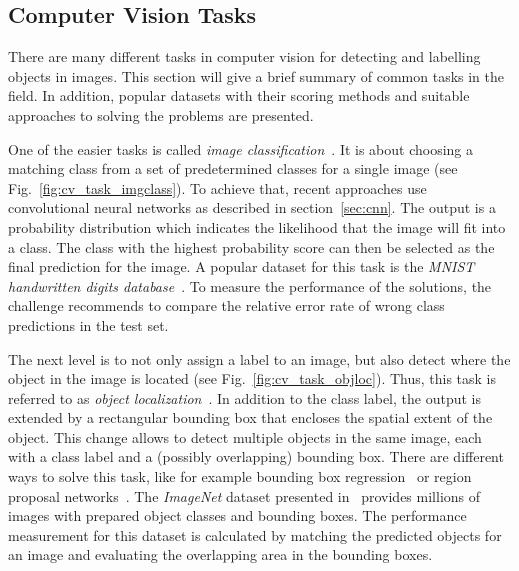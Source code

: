 \subsection{Computer Vision Tasks}
There are many different tasks in computer vision for detecting and labelling objects in images. This section will give a brief summary of common tasks in the field. In addition, popular datasets with their scoring methods and suitable approaches to solving the problems are presented.

One of the easier tasks is called \emph{image classification}~\cite[p.~98]{DLbook16}. It is about choosing a matching class from a set of predetermined classes for a single image (see Fig.~\ref{fig:cv_task_imgclass}). To achieve that, recent approaches use convolutional neural networks as described in section~\ref{sec:cnn}. The output is a probability distribution which indicates the likelihood that the image will fit into a class. The class with the highest probability score can then be selected as the final prediction for the image. A popular dataset for this task is the \emph{MNIST handwritten digits database}~\cite{mnist10}. To measure the performance of the solutions, the challenge recommends to compare the relative error rate of wrong class predictions in the test set.

The next level is to not only assign a label to an image, but also detect where the object in the image is located (see Fig.~\ref{fig:cv_task_objloc}). Thus, this task is referred to as \emph{object localization}~\cite{rcnn14}. In addition to the class label, the output is extended by a rectangular bounding box that encloses the spatial extent of the object. This change allows to detect multiple objects in the same image, each with a class label and a (possibly overlapping) bounding box. There are different ways to solve this task, like for example bounding box regression~\cite{obj_detection13} or region proposal networks~\cite{ff-rcnn17}. The \emph{ImageNet} dataset presented in~\cite{imgnet09} provides millions of images with prepared object classes and bounding boxes. The performance measurement for this dataset is calculated by matching the predicted objects for an image and evaluating the overlapping area in the bounding boxes.

